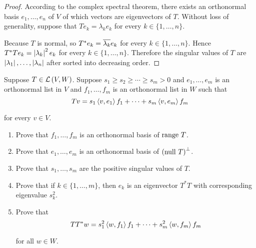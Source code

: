 \begin{proof}
    According to the complex spectral theorem, there exists an orthonormal basis $e_{1}, \ldots, e_{n}$ of $V$ of which vectors are eigenvectors of $T$. Without loss of generality, suppose that $Te_{k} = \lambda_{k}e_{k}$ for every $k\in\{1,\ldots,n\}$.

    Because $T$ is normal, so $T^{*}e_{k} = \overline{\lambda_{k}}e_{k}$ for every $k\in\{1,\ldots,n\}$. Hence $T^{*}Te_{k} = \left\vert{\lambda_{k}}\right\vert^{2}e_{k}$ for every $k\in\{1,\ldots,n\}$. Therefore the singular values of $T$ are $\left\vert{\lambda_{1}}\right\vert, \ldots, \left\vert{\lambda_{n}}\right\vert$ after sorted into decreasing order.
\end{proof}
\newpage

\begin{exercise}\label{chapter7:sectionE:exercise8}
    Suppose $T\in\mathcal{L}\left({V, W}\right)$. Suppose $s_{1}\geq s_{2}\geq \cdots\geq s_{m} > 0$ and $e_{1}, \ldots, e_{m}$ is an orthonormal list in $V$ and $f_{1}, \ldots, f_{m}$ is an orthonormal list in $W$ such that
    \[
        Tv = s_{1}\left\langle{v,e_{1}}\right\rangle f_{1} + \cdots + s_{m}\left\langle{v,e_{m}}\right\rangle f_{m}
    \]

    for every $v\in V$.
    \begin{enumerate}[label={(\alph*)}]
        \item Prove that $f_{1}, \ldots, f_{m}$ is an orthonormal basis of $\operatorname{range}\,{T}$.
        \item Prove that $e_{1}, \ldots, e_{m}$ is an orthonormal basis of ${(\operatorname{null}\,{T})}^{\bot}$.
        \item Prove that $s_{1}, \ldots, s_{m}$ are the positive singular values of $T$.
        \item Prove that if $k\in\{1,\ldots, m\}$, then $e_{k}$ is an eigenvector $T^{*}T$ with corresponding eigenvalue $s_{k}^{2}$.
        \item Prove that
              \[
                  TT^{*}w = s_{1}^{2}\left\langle{w, f_{1}}\right\rangle f_{1} + \cdots + s_{m}^{2}\left\langle{w, f_{m}}\right\rangle f_{m}
              \]

              for all $w\in W$.
    \end{enumerate}
\end{exercise}

